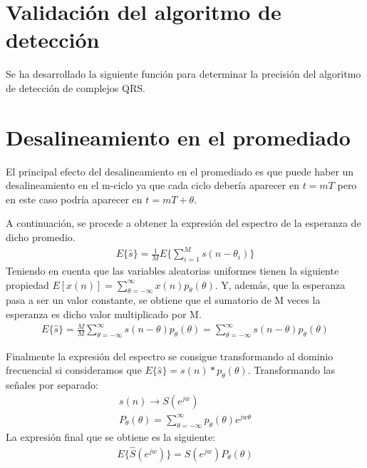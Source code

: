 \documentclass[12pt]{article}
\begin{document}
\section{Validación del algoritmo de detección}
Se ha desarrollado la siguiente función para determinar la precisión del algoritmo de detección de complejos QRS.\\



\section{Desalineamiento en el promediado}
El principal efecto del desalineamiento en el promediado es que puede haber un desalineamiento en el m-ciclo ya que cada ciclo debería aparecer en $t=mT$ pero en este caso podría aparecer en $t=mT+\theta$.

A continuación, se procede a obtener la expresión del espectro de la esperanza de dicho promedio.
\begin{gather*}
E\{ \hat{s} \} = \frac{1}{M} E\{ \sum_{i=1}^{M}s(n-\theta_i)  \}
\end{gather*}
Teniendo en cuenta que las variables aleatorias uniformes tienen la siguiente propiedad $E[x(n)] = \sum_{\theta = -\infty}^{\infty}x(n)p_{\theta}(\theta)$. Y, además, que la esperanza pasa a ser un valor constante, se obtiene que el sumatorio de M veces la esperanza es dicho valor multiplicado por M.
\begin{gather*}
E\{ \hat{s} \} = \frac{M}{M} \sum_{\theta = -\infty}^{\infty} s(n-\theta)p_{\theta}(\theta) = \sum_{\theta = -\infty}^{\infty} s(n-\theta)p_{\theta}(\theta)
\end{gather*}

Finalmente la expresión del espectro se consigue transformando al dominio frecuencial si consideramos que $E\{ \hat{s} \} = s(n)*p_{\theta}(\theta)$.
Transformando las señales por separado:
\begin{gather*}
s(n) \rightarrow S(e^{jw})\\
P_{\theta}(\theta) = \sum_{\theta = -\infty}^{\infty}p_{\theta}(\theta)e^{jw\theta}
\end{gather*}
La expresión final que se obtiene es la siguiente:
\begin{gather*}
E\{ \hat{S}(e^{jw}) \}=S(e^{jw})P_{\theta}(\theta)
\end{gather*}
\end{document}

